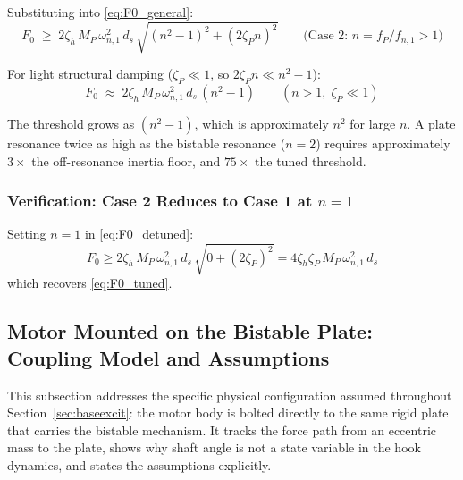 \documentclass[11pt,letterpaper]{article}
\begin{document}
Substituting into \cref{eq:F0_general}:
\begin{equation}
  \boxed{
    F_0 \;\geq\; 2\zeta_h\,M_P\,\omega_{n,1}^2\,d_s\,\sqrt{(n^2-1)^2 + (2\zeta_P n)^2}
    \qquad \text{(Case 2: }n = f_P/f_{n,1} > 1\text{)}
  }
  \label{eq:F0_detuned}
\end{equation}

For light structural damping ($\zeta_P \ll 1$, so $2\zeta_P n \ll n^2 - 1$):
\begin{equation}
  F_0 \;\approx\; 2\zeta_h\,M_P\,\omega_{n,1}^2\,d_s\,(n^2 - 1)
  \qquad (n > 1,\;\zeta_P \ll 1)
  \label{eq:F0_detuned_approx}
\end{equation}

The threshold grows as $(n^2-1)$, which is approximately $n^2$ for large $n$.
A plate resonance twice as high as the bistable resonance ($n=2$) requires
approximately $3\times$ the off-resonance inertia floor, and $75\times$ the tuned
threshold.

\subsubsection{Verification: Case 2 Reduces to Case 1 at \texorpdfstring{$n = 1$}{n = 1}}

Setting $n = 1$ in \cref{eq:F0_detuned}:
\begin{equation}
  F_0 \geq 2\zeta_h\,M_P\,\omega_{n,1}^2\,d_s\,\sqrt{0 + (2\zeta_P)^2}
      = 4\zeta_h\zeta_P\,M_P\,\omega_{n,1}^2\,d_s
\end{equation}
which recovers \cref{eq:F0_tuned}.

\subsection{Motor Mounted on the Bistable Plate: Coupling Model and Assumptions}
\label{ssec:motor_plate}

This subsection addresses the specific physical configuration assumed throughout
Section~\ref{sec:baseexcit}: the motor body is bolted directly to the same rigid
plate that carries the bistable mechanism. It tracks the force path from an
eccentric mass to the plate, shows why shaft angle is not a state variable in
the hook dynamics, and states the assumptions explicitly.

\end{document}
